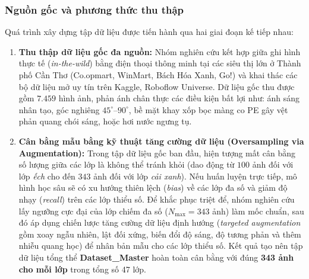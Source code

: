 \subsubsection{Nguồn gốc và phương thức thu thập}
Quá trình xây dựng tập dữ liệu được tiến hành qua hai giai đoạn kế tiếp nhau:
\begin{enumerate}[leftmargin=0.8cm, itemsep=2pt, topsep=2pt]
    \item \textbf{Thu thập dữ liệu gốc đa nguồn:} Nhóm nghiên cứu kết hợp giữa ghi hình thực tế (\textit{in-the-wild}) bằng điện thoại thông minh tại các siêu thị lớn ở Thành phố Cần Thơ (Co.opmart, WinMart, Bách Hóa Xanh, Go!) và khai thác các bộ dữ liệu mở uy tín trên Kaggle, Roboflow Universe. Dữ liệu gốc thu được gồm $7.459$ hình ảnh, phản ánh chân thực các điều kiện bất lợi như: ánh sáng nhân tạo, góc nghiêng $45^\circ\text{--}90^\circ$, bề mặt khay xốp bọc màng co PE gây vệt phản quang chói sáng, hoặc hơi nước ngưng tụ.
    \item \textbf{Cân bằng mẫu bằng kỹ thuật tăng cường dữ liệu (Oversampling via Augmentation):} Trong tập dữ liệu gốc ban đầu, hiện tượng mất cân bằng số lượng giữa các lớp là không thể tránh khỏi (dao động từ $100$ ảnh đối với lớp \textit{ếch} cho đến $343$ ảnh đối với lớp \textit{cải xanh}). Nếu huấn luyện trực tiếp, mô hình học sâu sẽ có xu hướng thiên lệch (\textit{bias}) về các lớp đa số và giảm độ nhạy (\textit{recall}) trên các lớp thiểu số. Để khắc phục triệt để, nhóm nghiên cứu lấy ngưỡng cực đại của lớp chiếm đa số ($N_{\max} = 343$ ảnh) làm mốc chuẩn, sau đó áp dụng chiến lược tăng cường dữ liệu định hướng (\textit{targeted augmentation} gồm xoay ngẫu nhiên, lật đối xứng, biến đổi độ sáng, độ tương phản và thêm nhiễu quang học) để nhân bản mẫu cho các lớp thiểu số. Kết quả tạo nên tập dữ liệu tổng thể \textbf{Dataset\_Master} hoàn toàn cân bằng với đúng \textbf{343 ảnh cho mỗi lớp} trong tổng số 47 lớp.
\end{enumerate}

